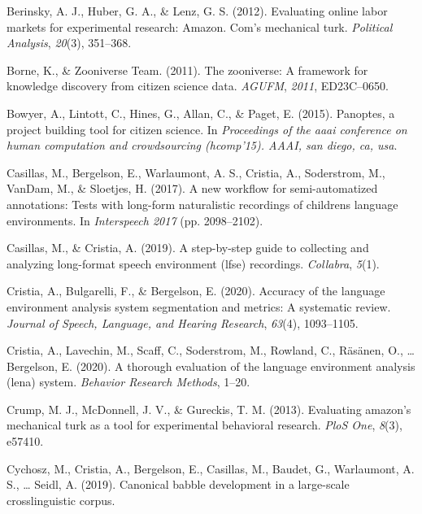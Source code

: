 \documentclass[english,,man,floatsintext]{apa6}
\begin{document}
\leavevmode\hypertarget{ref-berinsky2012evaluating}{}%
Berinsky, A. J., Huber, G. A., \& Lenz, G. S. (2012). Evaluating online labor markets for experimental research: Amazon. Com's mechanical turk. \emph{Political Analysis}, \emph{20}(3), 351--368.

\leavevmode\hypertarget{ref-borne2011zooniverse}{}%
Borne, K., \& Zooniverse Team. (2011). The zooniverse: A framework for knowledge discovery from citizen science data. \emph{AGUFM}, \emph{2011}, ED23C--0650.

\leavevmode\hypertarget{ref-bowyer2015panoptes}{}%
Bowyer, A., Lintott, C., Hines, G., Allan, C., \& Paget, E. (2015). Panoptes, a project building tool for citizen science. In \emph{Proceedings of the aaai conference on human computation and crowdsourcing (hcomp'15). AAAI, san diego, ca, usa}.

\leavevmode\hypertarget{ref-casillas2017new}{}%
Casillas, M., Bergelson, E., Warlaumont, A. S., Cristia, A., Soderstrom, M., VanDam, M., \& Sloetjes, H. (2017). A new workflow for semi-automatized annotations: Tests with long-form naturalistic recordings of childrens language environments. In \emph{Interspeech 2017} (pp. 2098--2102).

\leavevmode\hypertarget{ref-casillas2019step}{}%
Casillas, M., \& Cristia, A. (2019). A step-by-step guide to collecting and analyzing long-format speech environment (lfse) recordings. \emph{Collabra}, \emph{5}(1).

\leavevmode\hypertarget{ref-cristia2020accuracy}{}%
Cristia, A., Bulgarelli, F., \& Bergelson, E. (2020). Accuracy of the language environment analysis system segmentation and metrics: A systematic review. \emph{Journal of Speech, Language, and Hearing Research}, \emph{63}(4), 1093--1105.

\leavevmode\hypertarget{ref-cristia2020thorough}{}%
Cristia, A., Lavechin, M., Scaff, C., Soderstrom, M., Rowland, C., Räsänen, O., \ldots{} Bergelson, E. (2020). A thorough evaluation of the language environment analysis (lena) system. \emph{Behavior Research Methods}, 1--20.

\leavevmode\hypertarget{ref-crump2013evaluating}{}%
Crump, M. J., McDonnell, J. V., \& Gureckis, T. M. (2013). Evaluating amazon's mechanical turk as a tool for experimental behavioral research. \emph{PloS One}, \emph{8}(3), e57410.

\leavevmode\hypertarget{ref-cychosz2019canonical}{}%
Cychosz, M., Cristia, A., Bergelson, E., Casillas, M., Baudet, G., Warlaumont, A. S., \ldots{} Seidl, A. (2019). Canonical babble development in a large-scale crosslinguistic corpus.
\end{document}
